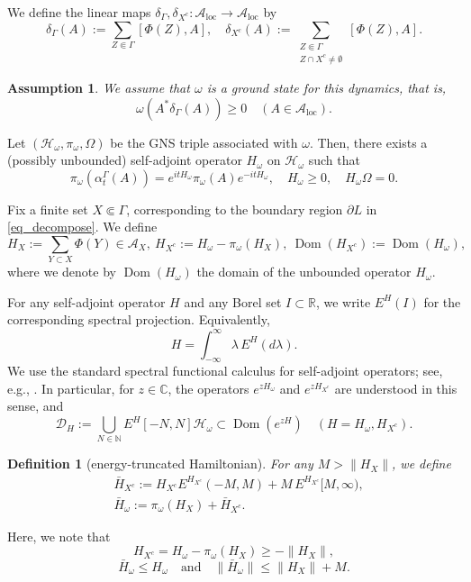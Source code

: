 \documentclass[11pt]{article}
\numberwithin{equation}{section}
\newtheorem{definition}[theorem]{Definition}
\newtheorem{assumption}[theorem]{Assumption}
\begin{document}
We define the linear maps \(\delta_\Gamma,\delta_{X^c}:\mathcal{A}_{\mathrm{loc}}\to
\mathcal{A}_{\mathrm{loc}}\) by
\[
\delta_\Gamma(A):=\sum_{Z\Subset\Gamma}[\Phi(Z),A],\quad
\delta_{X^c}(A):=\sum_{\substack{Z\Subset\Gamma\\ Z\cap X^c\neq\emptyset}}[\Phi(Z),A].
\]

\begin{assumption}
We assume that $\omega$ is a ground state for this dynamics, that is,
\[
\omega\left(A^*\delta_\Gamma(A)\right)\geq 0
\quad (A\in\mathcal{A}_{\mathrm{loc}}).
\]
\end{assumption}
Let $(\mathcal{H}_\omega,\pi_\omega,\Omega)$ be the GNS triple associated with $\omega$. Then, there exists a (possibly unbounded) self-adjoint operator $H_\omega$ on $\mathcal{H}_\omega$ such that
\[
\pi_\omega(\alpha_t^\Gamma(A))=e^{itH_\omega}\pi_\omega(A)e^{-itH_\omega},\quad H_\omega\geq0,\quad H_\omega\Omega=0.
\]

Fix a finite set $X\Subset\Gamma$, corresponding to the boundary region $\partial L$ in \eqref{eq_decompose}. We define
\[
H_X:=\sum_{Y\subset X}\Phi(Y)\in\mathcal{A}_X,\ 
H_{X^c}:=H_\omega-\pi_\omega(H_X),\ 
\operatorname{Dom}(H_{X^c}):=\operatorname{Dom}(H_\omega),
\]
where we denote by $\operatorname{Dom}(H_\omega)$ the domain of the unbounded operator $H_\omega$. 

For any self-adjoint operator $H$ and any Borel set $I\subset\mathbb R$, we write $E^H(I)$ for the corresponding spectral projection. Equivalently,
\[
H=\int_{-\infty}^{\infty}\lambda\,E^H(d\lambda).
\]
We use the standard spectral functional calculus for self-adjoint operators; see, e.g., \cite[Section 10.1, Proposition 10.1]{Hall:book}. In particular, for $z\in\mathbb{C}$, the operators $e^{zH_\omega}$ and $e^{zH_{X^c}}$ are understood in this sense, and
\[
\mathcal{D}_H:=\bigcup_{N\in\mathbb{N}}E^H[-N,N]\mathcal{H}_\omega\subset \operatorname{Dom}(e^{zH})\quad (H=H_\omega,H_{X^c}).
\]

\begin{definition}[energy-truncated Hamiltonian]
For any $M>\|H_X\|$, we define
\begin{align*}
&\bar{H}_{X^c}:= H_{X^c}E^{H_{X^c}}(-M,M)+M\,E^{H_{X^c}}[M,\infty),\\
&\bar{H}_\omega:=\pi_\omega(H_X)+\bar H_{X^c}.
\end{align*}
\end{definition}
Here, we note that
\[
H_{X^c}=H_\omega-\pi_\omega(H_X)\geq -\|H_X\|,
\]
\[
\bar{H}_\omega\leq H_\omega \quad\text{and}\quad
\|\bar{H}_\omega\|\leq\|H_X\|+M.
\]
\end{document}
